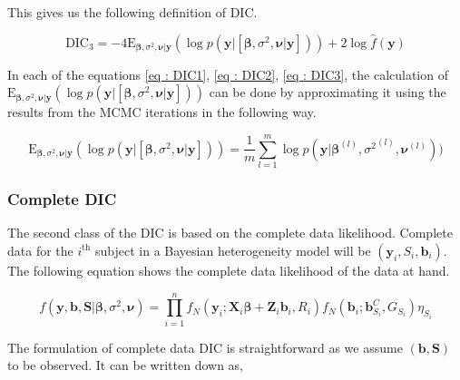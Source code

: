 This gives us the following definition of DIC.

\begin{equation}
\label{eq : DIC3}
\text{DIC}_3 = -4\text{E}_{\boldsymbol{\beta}, \sigma^2, \boldsymbol{\nu}|\boldsymbol{y}}(\log{p(\boldsymbol{y}|[\boldsymbol{\beta}, \sigma^2, \boldsymbol{\nu}|\boldsymbol{y}])}) + 2\log{\hat{f}(\boldsymbol{y})}
\end{equation}

In each of the equations \ref{eq : DIC1}, \ref{eq : DIC2}, \ref{eq : DIC3}, the calculation of $\text{E}_{\boldsymbol{\beta}, \sigma^2, \boldsymbol{\nu}|\boldsymbol{y}}(\log{p(\boldsymbol{y}|[\boldsymbol{\beta}, \sigma^2, \boldsymbol{\nu}|\boldsymbol{y}])}) $ can be done by approximating it using the results from the MCMC iterations in the following way.

\begin{equation}
\label{eq : mean_posterior_deviance_approx}
\text{E}_{\boldsymbol{\beta}, \sigma^2, \boldsymbol{\nu}|\boldsymbol{y}}(\log{p(\boldsymbol{y}|[\boldsymbol{\beta}, \sigma^2, \boldsymbol{\nu}|\boldsymbol{y}])})  = \frac 1 m \sum_{l=1}^m\log{p(\boldsymbol{y}|\boldsymbol{\beta}^{(l)}, {\sigma^2}^{(l)}, \boldsymbol{\nu}^{(l)})})
\end{equation}

\subsubsection{Complete DIC}
The second class of the DIC is based on the complete data likelihood. Complete data for the $i^\text{th}$ subject in a Bayesian heterogeneity model will be $(\boldsymbol{y}_i, S_i, \boldsymbol{b}_i)$. The following equation shows the complete data likelihood of the data at hand.

\begin{equation}
\label{eq : complete_data_likelihood}
f(\boldsymbol{y}, \boldsymbol{b}, \boldsymbol{S} | \boldsymbol{\beta}, \sigma^2, \boldsymbol{\nu}) = \prod_{i=1}^n f_N(\boldsymbol{y}_i; \boldsymbol{X}_i\boldsymbol{\beta} + \boldsymbol{Z}_i \boldsymbol{b}_i, R_i) f_N(\boldsymbol{b}_i; \boldsymbol{b}_{S_i}^C, G_{S_i}) \eta_{S_i}
\end{equation}

The formulation of complete data DIC is straightforward as we assume $(\boldsymbol{b}, \boldsymbol{S})$ to be observed. It can be written down as,


